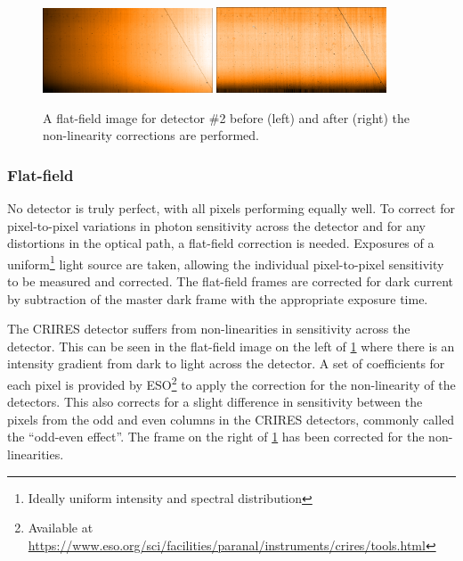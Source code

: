 \begin{figure}[h]
    \centering
        \includegraphics[width=0.45\textwidth]{figures/reduction/Flat_2.png} %
        \includegraphics[width=0.45\textwidth]{figures/reduction/FlatR_2.png} %
    \caption{A flat-field image for detector \#2 before (left) and after (right) the non-linearity corrections are performed.}
    \label{fig:masterflats_colour}
\end{figure}


\subsubsection{Flat-field}
\label{subsubsec:flat-field}
No detector is truly perfect, with all pixels performing equally well.
To correct for pixel-to-pixel variations in photon sensitivity across the detector and for any distortions in the optical path, a flat-field correction is needed.
Exposures of a uniform\footnote{Ideally uniform intensity and spectral distribution} light source are taken, allowing the individual pixel-to-pixel sensitivity to be measured and corrected.
The flat-field frames are corrected for dark current by subtraction of the master dark frame with the appropriate exposure time.

The {CRIRES} detector suffers from non-linearities in sensitivity across the detector.
This can be seen in the flat-field image on the left of \cref{fig:masterflats_colour} where there is an intensity gradient from dark to light across the detector.
A set of coefficients for each pixel is provided by {ESO}\footnote{Available at \href{https://www.eso.org/sci/facilities/paranal/instruments/crires/tools.html}{https://www.eso.org/sci/facilities/paranal/instruments/crires/tools.html}} to apply the correction for the non-linearity of the detectors.
This also corrects for a slight difference in sensitivity between the pixels from the odd and even columns in the {CRIRES} detectors, commonly called the ``odd-even effect''.
The frame on the right of \cref{fig:masterflats_colour} has been corrected for the non-linearities.

